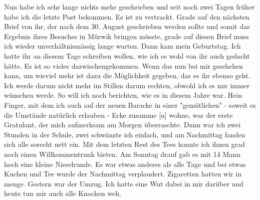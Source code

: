 \def\day{9. 11. 1943.}
\mktitle

Nun habe ich sehr lange nichts mehr geschrieben und seit noch zwei Tagen fr\"{u}her habe ich die letzte Post bekommen.
Es ist zu vertrackt.
Grade auf den n\"{a}chsten Brief von ihr, der nach dem 30. August geschrieben werden sollte und somit das Ergebnis ihres Besuches in M\"{u}rwik bringen m\"{u}sste, grade auf diesen Brief muss ich wieder unverh\"{a}ltnism\"{a}ssig lange warten.
Dann kam mein Geburtstag.
Ich hatte ihr an diesem Tage schreiben wollen, wie ich es wohl von ihr auch gedacht h\"{a}tte.
Es ist so vieles dazwischengekommen.
Wenn das nun bei mir geschehen kann, um wieviel mehr ist dazu die M\"{o}glichkeit gegeben, das es ihr ebenso geht.
Ich werde darum nicht mehr im Stillen darum rechten, obwohl ich es mir immer w\"{u}nschen werde.
So will ich noch berichten, wie es in diesem Jahre war.
Hein Finger, mit dem ich auch auf der neuen Baracke in einer "gem\"{u}tlichen" - soweit es die Umst\"{a}nde nat\"{u}rlich erlauben - Ecke zusamme{\color{red} [n] }wohne, war der erste Gratulant, der mich aufmerksam am Morgen \"{u}berraschte.
Dann war ich zwei Stunden in der Schule, zwei schw\"{a}nzte ich einfach, und am Nachmittag fanden sich alle sorecht nett ein.
Mit dem letzten Rest des Tees konnte ich ihnen grad noch einen Willkommentrunk bieten.
Am Sonntag drauf gab es mit 14 Mann hoch eine kleine Nieselrunde.
Es war etwas anderes als alle Tage und bei etwas Kuchen und Tee wurde der Nachmittag verplaudert.
Zigaretten hatten wir in menge.
Gestern war der Umzug.
Ich hatte eine Wut dabei in mir dar\"{u}ber und heute tun mir auch alle Knochen weh.

\clearpage
